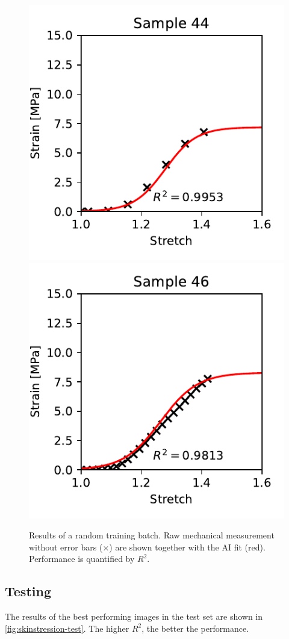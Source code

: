 \begin{figure}
    \includegraphics[width=0.24\linewidth]{skinstression/images/training/sample_44_1.pdf}
    \includegraphics[width=0.24\linewidth]{skinstression/images/training/sample_46_0.pdf}
    \caption[Training results]{
        Results of a random training batch.
        Raw mechanical measurement without error bars ($\times$) are shown together with the AI fit (red).
        Performance is quantified by $R^2$.
    }
    \label{fig:skinstression-train-logistic-curves}
\end{figure}

\subsection{Testing}
The results of the best performing images in the test set are shown in \cref{fig:skinstression-test}.
The higher $R^2$, the better the performance.

